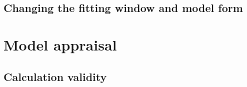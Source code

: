 \subsection{Changing the fitting window and model form}
                                                                                                                                                                                                                                                                                                                                                                                                                 
\begin{table}[H]\centering\small
\caption{                                                      }\label{tab:window}

\end{table}
                                                                                                                                                                                                                                                                                                                                                                   
\section{Model appraisal}\label{sec:appraisal}
                                                                                                                                                                                                                                                                                                                                                                                                                                                                
                                                                                                                                                                                                                                                                                                                                                                                                                                                                                                                                                                                                         
\subsection{Calculation validity}
                                                                                                                                                                                                                                                                                                                                                                                                                                      
